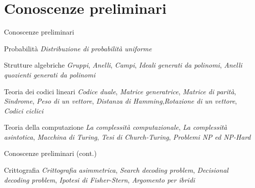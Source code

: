 \documentclass[10pt]{beamer}
\begin{document}
	\section{Conoscenze preliminari}
		\begin{frame}{Conoscenze preliminari}
			\begin{block}{Probabilità}
				\emph{Distribuzione di probabilità uniforme}
			\end{block}
			\begin{block}{Strutture algebriche}
				\emph{Gruppi}, \emph{Anelli}, \emph{Campi}, \emph{Ideali generati da polinomi}, \emph{Anelli quozienti generati da polinomi}
			\end{block}
			\begin{block}{Teoria dei codici lineari}
				\emph{Codice duale}, \emph{Matrice generatrice}, \emph{Matrice di parità}, \emph{Sindrome}, \emph{Peso di un vettore}, \emph{Distanza di Hamming},\emph{Rotazione di un vettore}, \emph{Codici ciclici}
			\end{block}
			\begin{block}{Teoria della computazione}
				\emph{La complessità computazionale}, \emph{La complessità asintotica}, \emph{Macchina di Turing}, \emph{Tesi di Church-Turing}, \emph{Problemi NP ed NP-Hard}
			\end{block}
		\end{frame}
		\begin{frame}{Conoscenze preliminari (cont.)}
			\begin{block}{Crittografia}
				\emph{Crittografia asimmetrica}, \emph{Search decoding problem}, \emph{Decisional decoding problem}, \emph{Ipotesi di Fisher-Stern}, \emph{Argomento per ibridi}
			\end{block}
		\end{frame}
\end{document}
